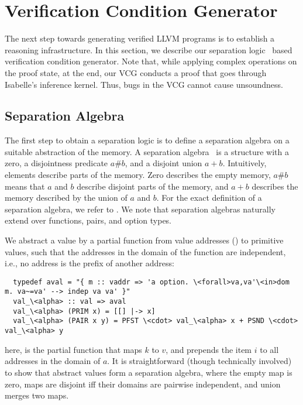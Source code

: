 \documentclass[a4paper,oribibl,envcountsame]{llncs}
\begin{document}
\section{Verification Condition Generator}\label{sec:vcg}
The next step towards generating verified LLVM programs is to establish a reasoning infrastructure. 
In this section, we describe our separation logic~\cite{Rey02} based verification condition generator.
Note that, while applying complex operations on the proof state, at the end, our VCG conducts a proof 
that goes through Isabelle's inference kernel. Thus, bugs in the VCG cannot cause unsoundness.

\subsection{Separation Algebra}
The first step to obtain a separation logic is to define a separation algebra on a suitable abstraction of the memory.
A separation algebra~\cite{CHY07} is a structure with a zero, a disjointness predicate $a\#b$, 
and a disjoint union $a+b$.
Intuitively, elements describe parts of the memory. 
Zero describes the empty memory, $a\#b$ means that $a$ and $b$ describe disjoint parts of the memory,
and $a+b$ describes the memory described by the union of $a$ and $b$. 
For the exact definition of a separation algebra, we refer to \cite{CHY07,KKB12}. We note that 
separation algebras naturally extend over functions, pairs, and option types. 

We abstract a value by a partial function from value addresses () to primitive values, 
such that the addresses in the domain of the function are independent, i.e., no address is the prefix of another address:
\begin{lstlisting}
  typedef aval = "{ m :: vaddr => 'a option. \<forall>va,va'\<in>dom m. va~=va' --> indep va va' }"
  val_\<alpha> :: val => aval
  val_\<alpha> (PRIM x) = [[] |-> x]
  val_\<alpha> (PAIR x y) = PFST \<cdot> val_\<alpha> x + PSND \<cdot> val_\<alpha> y
\end{lstlisting}
here, \q{\is{[k |->v]}} is the partial function that maps $k$ to $v$, and  
prepends the item $i$ to all addresses in the domain of $a$. 
It is straightforward (though technically involved) to show that abstract values form a separation algebra, 
where the empty map is zero, maps are disjoint iff their domains are pairwise independent, and union merges two maps.
\end{document}
